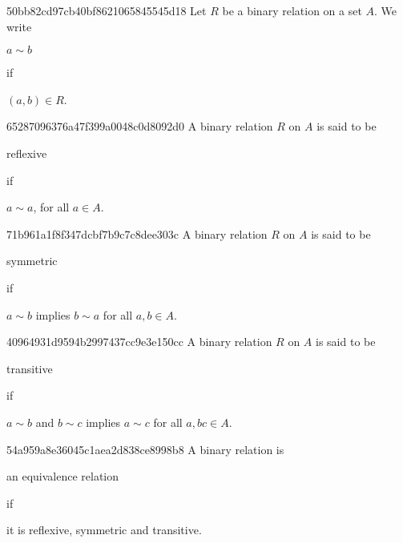 \begin{note}{50bb82cd97cb40bf8621065845545d18}
    Let \({ R }\) be a binary relation on a set \({ A }\).
    We write \begin{icloze}{2}\({ a \sim b }\)\end{icloze} if \begin{icloze}{1}\({ (a, b) \in R }\).\end{icloze}
\end{note}

\begin{note}{65287096376a47f399a0048c0d8092d0}
    A binary relation \({ R }\) on \({ A }\) is said to be \begin{icloze}{2}reflexive\end{icloze} if
    \begin{icloze}{1}
        \begin{center}
            \({ a \sim a }\), for all \({ a \in A }\).
        \end{center}
    \end{icloze}
\end{note}

\begin{note}{71b961a1f8f347dcbf7b9c7c8dee303c}
    A binary relation \({ R }\) on \({ A }\) is said to be \begin{icloze}{2}symmetric\end{icloze} if
    \begin{icloze}{1}
        \begin{center}
            \({ a \sim b }\) implies \({ b \sim a }\) for all \({ a, b \in A }\).
        \end{center}
    \end{icloze}
\end{note}

\begin{note}{40964931d9594b2997437cc9e3e150cc}
    A binary relation \({ R }\) on \({ A }\) is said to be \begin{icloze}{2}transitive\end{icloze} if
    \begin{icloze}{1}
        \begin{center}
            \({ a \sim b }\) and \({ b \sim c }\) implies \({ a \sim c }\) for all \({ a, b c \in A }\).
        \end{center}
    \end{icloze}
\end{note}

\begin{note}{54a959a8e36045c1aea2d838ce8998b8}
    A binary relation is \begin{icloze}{2}an equivalence relation\end{icloze} if \begin{icloze}{1}it is reflexive, symmetric and transitive.\end{icloze}
\end{note}


